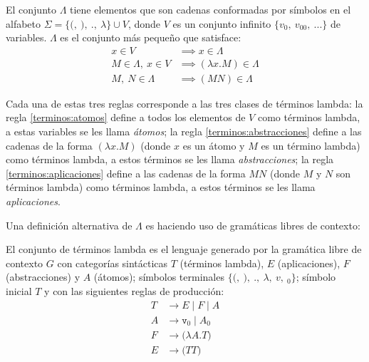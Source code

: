 \begin{defn}
  El conjunto \( Λ \) tiene elementos que son cadenas conformadas por símbolos en el alfabeto \( Σ=\{\mathtt{(},\ \mathtt{)},\ \mathtt{.},\ λ\} \cup V \), donde \( V \) es un conjunto infinito \( \{v_{0},\ v_{00},\ ... \} \) de variables. \( Λ \) es el conjunto más pequeño que satisface:
  \label{defn:terminos}
  \begin{subequations}
    \begin{align}
      \label{terminos:atomos} \tag{a}
      x \in V & \implies x \in Λ \\
      \label{terminos:abstracciones} \tag{b}
      M \in Λ,\ x \in V & \implies (λx.M) \in Λ \\
      \label{terminos:aplicaciones} \tag{c}
      M,\ N \in Λ & \implies (M N) \in Λ
    \end{align}
  \end{subequations}
\end{defn}

Cada una de estas tres reglas corresponde a las tres clases de términos lambda: la regla \eqref{terminos:atomos} define a todos los elementos de \( V \) como términos lambda, a estas variables se les llama \emph{átomos}; la regla \eqref{terminos:abstracciones} define a las cadenas de la forma \( (λx.M) \) (donde \( x \) es un átomo y \( M \) es un término lambda) como términos lambda, a estos términos se les llama \emph{abstracciones}; la regla \eqref{terminos:aplicaciones} define a las cadenas de la forma \( M N \) (donde \( M \) y \( N \) son términos lambda) como términos lambda, a estos términos se les llama \emph{aplicaciones}.

Una definición alternativa de \( Λ \) es haciendo uso de gramáticas libres de contexto:

\begin{defn}
  El conjunto de términos lambda es el lenguaje generado por la gramática libre de contexto \( G \) con categorías sintácticas \( T \) (términos lambda), \( E \) (aplicaciones), \( F \) (abstracciones) y \( A \) (átomos); símbolos terminales \( \{\mathtt{(},\ \mathtt{)},\ \mathtt{.},\ λ,\ v,\ {}_{0}\} \); símbolo inicial \( T \) y con las siguientes reglas de producción:
  \label{terminos-cfg}
  \begin{subequations}
    \begin{align}
      \label{terminos-cfg:terminos} \tag{a}
      T & \rightarrow E \mid F \mid A \\
      \label{terminos-cfg:atomos} \tag{b}
      A & \rightarrow \mathtt{v}_{0} \mid A {}_{0} \\
      \label{terminos-cfg:abstracciones} \tag{c}
      F & \rightarrow \mathtt{(} λ A \mathtt{.} T \mathtt{)} \\
      \label{terminos-cfg:aplicaciones} \tag{d}
      E & \rightarrow \mathtt{(} T T \mathtt{)}
    \end{align}
  \end{subequations}
\end{defn}

